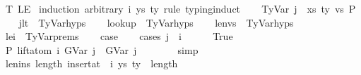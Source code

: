 \begin{isabellebody}
%
\isadelimproof
%
\endisadelimproof
%
\isatagproof
{}\isamarkupfalse%
\ T\ LE\isanewline
{}\isamarkupfalse%
\ {\isacharparenleft}{\kern0pt}induction\ arbitrary{\isacharcolon}{\kern0pt}\ i\ ys\ ty{}\ rule{\isacharcolon}{\kern0pt}\ typing{\isachardot}{\kern0pt}induct{\isacharparenright}{\kern0pt}\isanewline
\ \ \isamarkupfalse%
\ {\isacharparenleft}{\kern0pt}TyVar\ j\ {\isasymGamma}\ xs\ ty\ vs\ P{\isacharparenright}{\kern0pt}\isanewline
\ \ \isamarkupfalse%
\ j{\isacharunderscore}{\kern0pt}lt\ {\isacharequal}{\kern0pt}\ TyVar{\isachardot}{\kern0pt}hyps{\isacharparenleft}{\kern0pt}{}{\isacharparenright}{\kern0pt}\isanewline
\ \ \isamarkupfalse%
\ lookup\ {\isacharequal}{\kern0pt}\ TyVar{\isachardot}{\kern0pt}hyps{\isacharparenleft}{\kern0pt}{}{\isacharparenright}{\kern0pt}\isanewline
\ \ \isamarkupfalse%
\ len{\isacharunderscore}{\kern0pt}vs\ {\isacharequal}{\kern0pt}\ TyVar{\isachardot}{\kern0pt}hyps{\isacharparenleft}{\kern0pt}{}{\isacharparenright}{\kern0pt}\isanewline
\ \ \isamarkupfalse%
\ le{\isacharunderscore}{\kern0pt}i\ {\isacharequal}{\kern0pt}\ TyVar{\isachardot}{\kern0pt}prems\isanewline
\isanewline
\ \ \isamarkupfalse%
\ {\isacharquery}{\kern0pt}case\isanewline
\ \ \isamarkupfalse%
\ {\isacharparenleft}{\kern0pt}cases\ {\isachardoublequoteopen}j\ {\isacharless}{\kern0pt}\ i{\isachardoublequoteclose}{\isacharparenright}{\kern0pt}\isanewline
\ \ \ \ \isamarkupfalse%
\ True\isanewline
\ \ \ \ \isamarkupfalse%
\ \isamarkupfalse%
\ P{}{\isacharcolon}{\kern0pt}\ {\isachardoublequoteopen}lift{\isacharunderscore}{\kern0pt}atom\ i\ {\isacharparenleft}{\kern0pt}GVar\ j{\isacharparenright}{\kern0pt}\ {\isacharequal}{\kern0pt}\ GVar\ j{\isachardoublequoteclose}\isanewline
\ \ \ \ \ \ \isamarkupfalse%
\ simp\isanewline
\isanewline
\ \ \ \ \isamarkupfalse%
\ len{\isacharunderscore}{\kern0pt}ins{\isacharcolon}{\kern0pt}\ {\isachardoublequoteopen}length\ {\isacharparenleft}{\kern0pt}insert{\isacharunderscore}{\kern0pt}at\ {\isasymGamma}\ i\ {\isacharparenleft}{\kern0pt}ys{\isacharcomma}{\kern0pt}\ ty{}{\isacharparenright}{\kern0pt}{\isacharparenright}{\kern0pt}\ {\isacharequal}{\kern0pt}\ length\ {\isasymGamma}\ {\isacharplus}{\kern0pt}\ {}{\isachardoublequoteclose}\isanewline
\ \ \ \ \ \ \isamarkupfalse%

\end{isabellebody}
